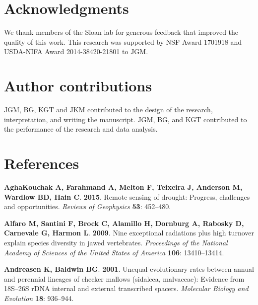 \documentclass[man,floatsintext]{apa6}
\theoremstyle{definition}
\theoremstyle{definition}
\theoremstyle{definition}
\theoremstyle{remark}
\begin{document}
\hypertarget{acknowledgments}{%
\section{Acknowledgments}\label{acknowledgments}}

We thank members of the Sloan lab for generous feedback that improved
the quality of this work. This research was supported by NSF Award
1701918 and USDA-NIFA Award 2014-38420-21801 to JGM.

\hypertarget{author-contributions}{%
\section{Author contributions}\label{author-contributions}}

JGM, BG, KGT and JKM contributed to the design of the research,
interpretation, and writing the manuscript. JGM, BG, and KGT contributed
to the performance of the research and data analysis.

\hypertarget{references}{%
\section{References}\label{references}}

\newpage

\begingroup
\setlength{\parindent}{-0.5in}
\setlength{\leftskip}{0.5in}

\hypertarget{refs}{}
\leavevmode\hypertarget{ref-aghakouchak2015remote}{}%
\textbf{\textnormal{AghaKouchak A}, \textnormal{Farahmand A},
\textnormal{Melton F}, \textnormal{Teixeira J}, \textnormal{Anderson M},
\textnormal{Wardlow BD}, \textnormal{Hain C}}. \textbf{2015}. Remote
sensing of drought: Progress, challenges and opportunities.
\emph{Reviews of Geophysics} \textbf{53}: 452--480.

\leavevmode\hypertarget{ref-R-geiger_a}{}%
\textbf{\textnormal{Alfaro M}, \textnormal{Santini F}, \textnormal{Brock
C}, \textnormal{Alamillo H}, \textnormal{Dornburg A},
\textnormal{Rabosky D}, \textnormal{Carnevale G}, \textnormal{Harmon
L}}. \textbf{2009}. Nine exceptional radiations plus high turnover
explain species diversity in jawed vertebrates. \emph{Proceedings of the
National Academy of Sciences of the United States of America}
\textbf{106}: 13410--13414.

\leavevmode\hypertarget{ref-andreasen2001unequal}{}%
\textbf{\textnormal{Andreasen K}, \textnormal{Baldwin BG}}.
\textbf{2001}. Unequal evolutionary rates between annual and perennial
lineages of checker mallows (sidalcea, malvaceae): Evidence from
18S--26S rDNA internal and external transcribed spacers. \emph{Molecular
Biology and Evolution} \textbf{18}: 936--944.
\end{document}
